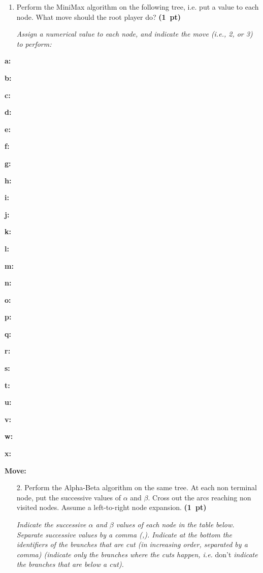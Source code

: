 \documentclass[11pt,a4paper]{report}
\begin{document}
\begin{enumerate}
\item Perform the MiniMax algorithm on the following tree, i.e.
      put a value to each node. What move should the root player do? \textbf{(1~pt)}
      
      \textit{Assign a numerical value to each node, and indicate the move (i.e., 2, or 3) to perform:}
\end{enumerate}
      \begin{answers}[3cm]
      \begin{multicols}{5}
      \textbf{a: } %
      
      \textbf{b: } %
      
      \textbf{c: } %
      
      \textbf{d: }
      
      \textbf{e: }
      
      \textbf{f: }
      
      \textbf{g: }
      
      \textbf{h: }
      
      \textbf{i: }
      
      \textbf{j: }
      
      \textbf{k: }
      
      \textbf{l: }
      
      \textbf{m: }
      
      \textbf{n: }
      
      \textbf{o: }
      
      \textbf{p: }
      
      \textbf{q: }
      
      \textbf{r: }
      
      \textbf{s: }
      
      \textbf{t: }
      
      \textbf{u: }
      
      \textbf{v: }
      
      \textbf{w: }
      
      \textbf{x: }
      
      \textbf{Move: } %
      \end{multicols}
	  \end{answers}



\begin{enumerate}
\item[2.] Perform the Alpha-Beta algorithm on the same tree.
      At each non terminal node, put the successive values of $\alpha$ and
      $\beta$. Cross out the arcs reaching non visited nodes. Assume a
      left-to-right node expansion. \textbf{(1~pt)}
      
      \textit{Indicate the successive $\alpha$ and $\beta$ values of each node in the table below. Separate successive values by a comma (,). Indicate at the bottom the identifiers of the branches that are cut (in increasing order, separated by a comma) (indicate only the branches where the cuts happen, i.e.\!} don't \textit{indicate the branches that are below a cut).}
\end{enumerate}
\end{document}
